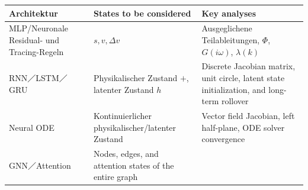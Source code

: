 \documentclass[11pt,a4paper,openany]{book}
\numberwithin{equation}{chapter}
\numberwithin{figure}{chapter}
\numberwithin{table}{chapter}
\begin{document}
\begin{center}
\small
{}
\label{tab:ml-architecture-tools}
\begin{tabular}{p{3.0cm}p{4.4cm}p{6.7cm}}
\toprule
\textbf{Architektur} & \textbf{States to be considered} & \textbf{Key analyses} \\
\midrule







MLP/Neuronale Residual- und Tracing-Regeln




& $s,v,\Delta v$ &




Ausgeglichene Teilableitungen, $\Phi$, $G(i\omega)$, $\lambda(k)$



\\
RNN／LSTM／GRU &




 Physikalischer Zustand $+$, latenter Zustand $h$




&






Discrete Jacobian matrix, unit circle, latent state initialization, and long-term rollover





\\
Neural ODE &




 Kontinuierlicher physikalischer/latenter Zustand




&






Vector field Jacobian, left half-plane, ODE solver convergence





\\
GNN／Attention &






Nodes, edges, and attention states of the entire graph






&







\end{tabular}
\end{center}
\end{document}
